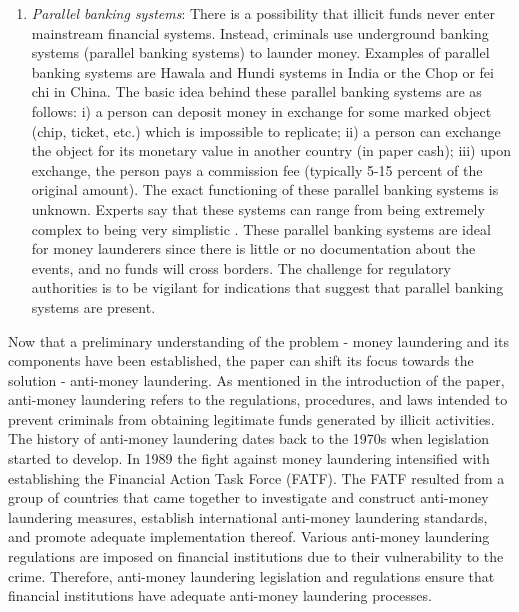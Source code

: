 \begin{enumerate}
\item \textit{Parallel banking systems}: There is a possibility that illicit funds never enter mainstream financial systems. Instead, criminals use underground banking systems (parallel banking systems) to launder money. Examples of parallel banking systems are Hawala and Hundi systems in India or the Chop or fei chi in China. The basic idea behind these parallel banking systems are as follows: i) a person can deposit money in exchange for some marked object (chip, ticket, etc.) which is impossible to replicate; ii) a person can exchange the object for its monetary value in another country (in paper cash); iii) upon exchange, the person pays a commission fee (typically 5-15 percent of the original amount). The exact functioning of these parallel banking systems is unknown. Experts say that these systems can range from being extremely complex to being very simplistic \citep*{schramm2003evolution}. These parallel banking systems are ideal for money launderers since there is little or no documentation about the events, and no funds will cross borders. The challenge for regulatory authorities is to be vigilant for indications that suggest that parallel banking systems are present. 
\end{enumerate}

Now that a preliminary understanding of the problem - money laundering and its components have been established, the paper can shift its focus towards the solution - anti-money laundering. As mentioned in the introduction of the paper, anti-money laundering refers to the regulations, procedures, and laws intended to prevent criminals from obtaining legitimate funds generated by illicit activities. The history of anti-money laundering dates back to the 1970s when legislation started to develop. In 1989 the fight against money laundering intensified with establishing the Financial Action Task Force (FATF). The FATF resulted from a group of countries that came together to investigate and construct anti-money laundering measures, establish international anti-money laundering standards, and promote adequate implementation thereof. Various anti-money laundering regulations are imposed on financial institutions due to their vulnerability to the crime. Therefore, anti-money laundering legislation and regulations ensure that financial institutions have adequate anti-money laundering processes. 

